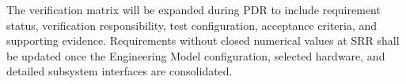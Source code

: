 The verification matrix will be expanded during PDR to include requirement status, verification responsibility, test configuration, acceptance criteria, and supporting evidence. Requirements without closed numerical values at SRR shall be updated once the Engineering Model configuration, selected hardware, and detailed subsystem interfaces are consolidated.